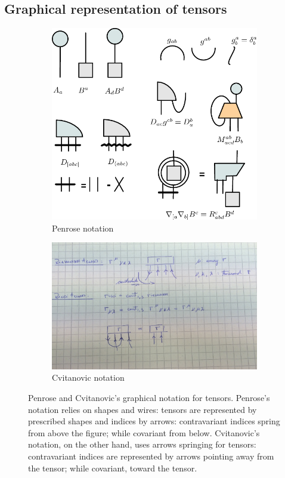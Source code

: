 \subsection{Graphical representation of tensors}
%
\begin{figure}[b]
  \capstart
  \centering
  \begin{subfigure}{0.55\textwidth}
    \includegraphics[width=\textwidth]{./graph/penrose}
    \caption{Penrose notation}
    \label{fig:penrosenotationfortensors}
  \end{subfigure}
  \begin{subfigure}{0.60\textwidth}
    \includegraphics[width=\textwidth]{./graph/cvitanovic}
    \caption{Cvitanovic notation}
    \label{fig:cvitanovicnotationfortensors}
  \end{subfigure}
  \caption{Penrose and Cvitanovic's graphical notation for tensors. Penrose's notation relies on shapes and wires: tensors are represented by prescribed shapes and indices by arrows: contravariant indices spring from above the figure; while covariant from below. Cvitanovic's notation, on the other hand, uses arrows springing for tensors: contravariant indices are represented by arrows pointing away from the tensor; while covariant, toward the tensor.}
  \label{fig:graphicalnotationfortensors}
\end{figure}
